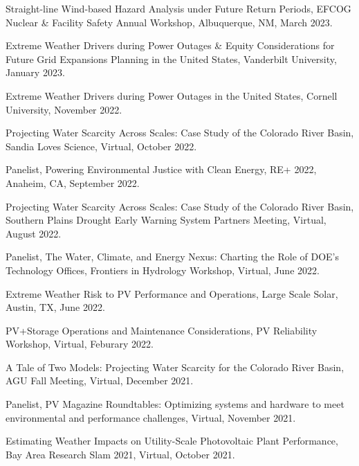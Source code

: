 \documentclass{article}[12pt]
\begin{document}
\begin{etaremune}[]
		\item Straight-line Wind-based Hazard Analysis under Future Return Periods, EFCOG Nuclear \& Facility Safety Annual Workshop, Albuquerque, NM, March 2023.
		
		\item Extreme Weather Drivers during Power Outages \& Equity Considerations for Future Grid Expansions Planning in the United States, Vanderbilt University, January 2023.
		
		\item Extreme Weather Drivers during Power Outages in the United States, Cornell University, November 2022.
		
		\item Projecting Water Scarcity Across Scales: Case Study of the Colorado River Basin, Sandia Loves Science, Virtual, October 2022.
		
		\item Panelist, Powering Environmental Justice with Clean Energy, RE+ 2022, Anaheim, CA, September 2022.
		
		\item Projecting Water Scarcity Across Scales: Case Study of the Colorado River Basin, Southern Plains Drought Early Warning System Partners Meeting, Virtual, August 2022.
		
		\item Panelist, The Water, Climate, and Energy Nexus: Charting the Role of DOE's Technology Offices, Frontiers in Hydrology Workshop, Virtual, June 2022.
		
		\item Extreme Weather Risk to PV Performance and Operations, Large Scale Solar, Austin, TX, June 2022.
		
		\item PV+Storage Operations and Maintenance Considerations, PV Reliability Workshop, Virtual, Feburary 2022. 
		
		\item A Tale of Two Models: Projecting Water Scarcity for the Colorado River Basin, AGU Fall Meeting, Virtual, December 2021.
		
		\item Panelist, PV Magazine Roundtables: Optimizing systems and hardware to meet environmental and performance challenges, Virtual, November 2021.
		
		\item Estimating Weather Impacts on Utility-Scale Photovoltaic Plant Performance, Bay Area Research Slam 2021, Virtual, October 2021. 
		

\end{etaremune}
\end{document}
